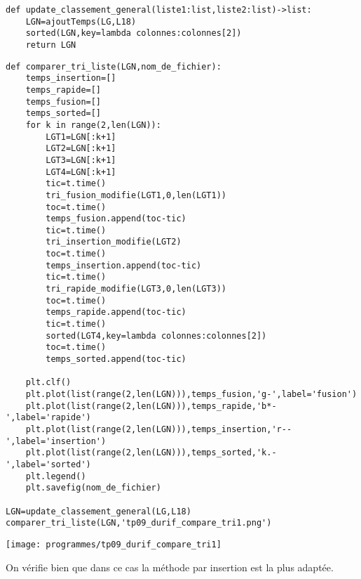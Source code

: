 \begin{lstlisting}
def update_classement_general(liste1:list,liste2:list)->list:
    LGN=ajoutTemps(LG,L18)
    sorted(LGN,key=lambda colonnes:colonnes[2])
    return LGN
\end{lstlisting}





\begin{lstlisting}
def comparer_tri_liste(LGN,nom_de_fichier):
    temps_insertion=[]
    temps_rapide=[]
    temps_fusion=[]
    temps_sorted=[]
    for k in range(2,len(LGN)):
        LGT1=LGN[:k+1]
        LGT2=LGN[:k+1]
        LGT3=LGN[:k+1]
        LGT4=LGN[:k+1]
        tic=t.time()
        tri_fusion_modifie(LGT1,0,len(LGT1))
        toc=t.time()
        temps_fusion.append(toc-tic)
        tic=t.time()
        tri_insertion_modifie(LGT2)
        toc=t.time()
        temps_insertion.append(toc-tic)
        tic=t.time()
        tri_rapide_modifie(LGT3,0,len(LGT3))
        toc=t.time()
        temps_rapide.append(toc-tic)
        tic=t.time()
        sorted(LGT4,key=lambda colonnes:colonnes[2])
        toc=t.time()
        temps_sorted.append(toc-tic)

    plt.clf()
    plt.plot(list(range(2,len(LGN))),temps_fusion,'g-',label='fusion')
    plt.plot(list(range(2,len(LGN))),temps_rapide,'b*-',label='rapide')
    plt.plot(list(range(2,len(LGN))),temps_insertion,'r--',label='insertion')
    plt.plot(list(range(2,len(LGN))),temps_sorted,'k.-',label='sorted')
    plt.legend()
    plt.savefig(nom_de_fichier)

LGN=update_classement_general(LG,L18)
comparer_tri_liste(LGN,'tp09_durif_compare_tri1.png')
\end{lstlisting}


\begin{center}
\texttt{[image: programmes/tp09\_durif\_compare\_tri1]}
\end{center}


On vérifie bien que dans ce cas la méthode par insertion est la plus adaptée.

